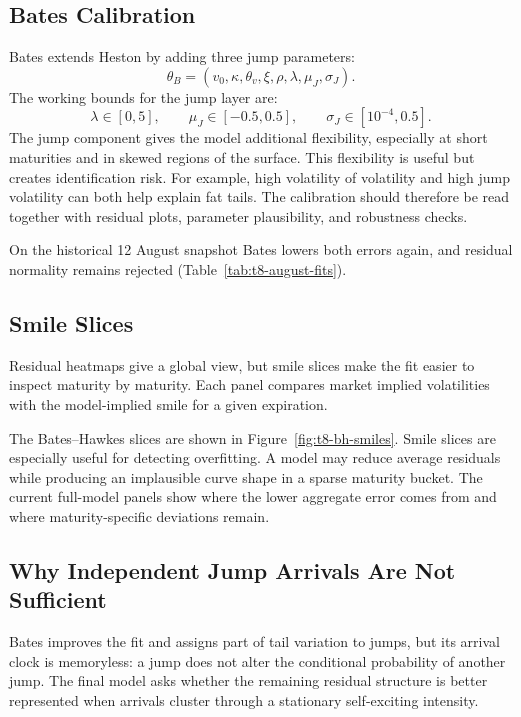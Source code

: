 \subsection{Bates Calibration}

Bates extends Heston by adding three jump parameters:
\[
    \theta_B=(v_0,\kappa,\theta_v,\xi,\rho,\lambda,\mu_J,\sigma_J).
\]
The working bounds for the jump layer are:
\[
    \lambda\in[0,5],\qquad
    \mu_J\in[-0.5,0.5],\qquad
    \sigma_J\in[10^{-4},0.5].
\]
The jump component gives the model additional flexibility, especially at short maturities and in skewed regions of the surface. This flexibility is useful but creates identification risk. For example, high volatility of volatility and high jump volatility can both help explain fat tails. The calibration should therefore be read together with residual plots, parameter plausibility, and robustness checks.

On the historical 12 August snapshot Bates lowers both errors again, and residual normality remains rejected (Table~\ref{tab:t8-august-fits}).

\vspace{1cm}
\subsection{Smile Slices}

Residual heatmaps give a global view, but smile slices make the fit easier to inspect maturity by maturity. Each panel compares market implied volatilities with the model-implied smile for a given expiration.

The Bates--Hawkes slices are shown in Figure~\ref{fig:t8-bh-smiles}. Smile slices are especially useful for detecting overfitting. A model may reduce average residuals while producing an implausible curve shape in a sparse maturity bucket. The current full-model panels show where the lower aggregate error comes from and where maturity-specific deviations remain.


\subsection{Why Independent Jump Arrivals Are Not Sufficient}

Bates improves the fit and assigns part of tail variation to jumps, but its arrival clock is memoryless: a jump does not alter the conditional probability of another jump. The final model asks whether the remaining residual structure is better represented when arrivals cluster through a stationary self-exciting intensity.

